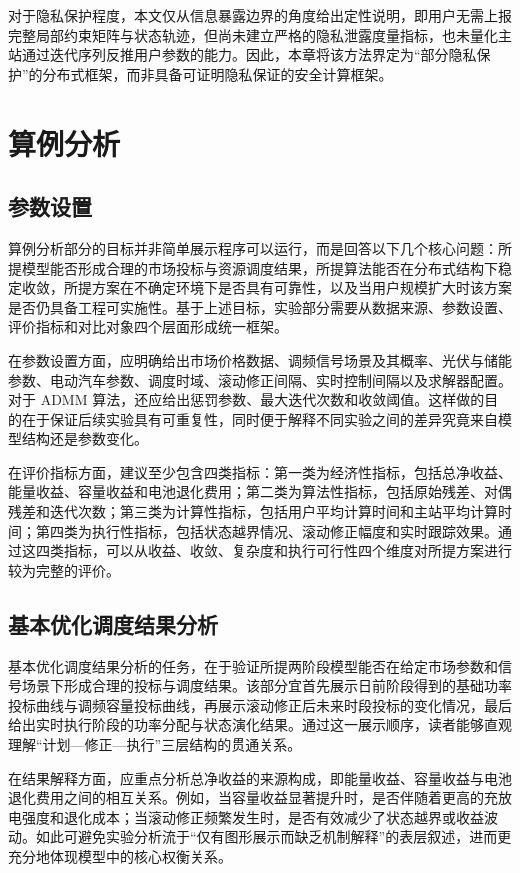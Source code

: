 对于隐私保护程度，本文仅从信息暴露边界的角度给出定性说明，即用户无需上报完整局部约束矩阵与状态轨迹，但尚未建立严格的隐私泄露度量指标，也未量化主站通过迭代序列反推用户参数的能力。因此，本章将该方法界定为“部分隐私保护”的分布式框架，而非具备可证明隐私保证的安全计算框架。

\section{算例分析}
\label{sec:vpp_admm_case}

\subsection{参数设置}
\label{subsec:vpp_admm_case_params}

算例分析部分的目标并非简单展示程序可以运行，而是回答以下几个核心问题：所提模型能否形成合理的市场投标与资源调度结果，所提算法能否在分布式结构下稳定收敛，所提方案在不确定环境下是否具有可靠性，以及当用户规模扩大时该方案是否仍具备工程可实施性。基于上述目标，实验部分需要从数据来源、参数设置、评价指标和对比对象四个层面形成统一框架。

在参数设置方面，应明确给出市场价格数据、调频信号场景及其概率、光伏与储能参数、电动汽车参数、调度时域、滚动修正间隔、实时控制间隔以及求解器配置。对于 ADMM 算法，还应给出惩罚参数、最大迭代次数和收敛阈值。这样做的目的在于保证后续实验具有可重复性，同时便于解释不同实验之间的差异究竟来自模型结构还是参数变化。

在评价指标方面，建议至少包含四类指标：第一类为经济性指标，包括总净收益、能量收益、容量收益和电池退化费用；第二类为算法性指标，包括原始残差、对偶残差和迭代次数；第三类为计算性指标，包括用户平均计算时间和主站平均计算时间；第四类为执行性指标，包括状态越界情况、滚动修正幅度和实时跟踪效果。通过这四类指标，可以从收益、收敛、复杂度和执行可行性四个维度对所提方案进行较为完整的评价。

\subsection{基本优化调度结果分析}
\label{subsec:vpp_admm_case_basic}

基本优化调度结果分析的任务，在于验证所提两阶段模型能否在给定市场参数和信号场景下形成合理的投标与调度结果。该部分宜首先展示日前阶段得到的基础功率投标曲线与调频容量投标曲线，再展示滚动修正后未来时段投标的变化情况，最后给出实时执行阶段的功率分配与状态演化结果。通过这一展示顺序，读者能够直观理解“计划—修正—执行”三层结构的贯通关系。

在结果解释方面，应重点分析总净收益的来源构成，即能量收益、容量收益与电池退化费用之间的相互关系。例如，当容量收益显著提升时，是否伴随着更高的充放电强度和退化成本；当滚动修正频繁发生时，是否有效减少了状态越界或收益波动。如此可避免实验分析流于“仅有图形展示而缺乏机制解释”的表层叙述，进而更充分地体现模型中的核心权衡关系。

